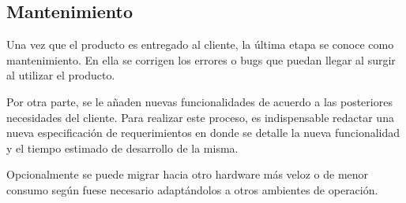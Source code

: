 \subsection{Mantenimiento}
Una vez que el producto es entregado al cliente, la última etapa se conoce como mantenimiento.
En ella se corrigen los errores o bugs que puedan llegar al surgir al utilizar el producto.

Por otra parte, se le añaden nuevas funcionalidades de acuerdo a las posteriores necesidades del cliente.
Para realizar este proceso, es indispensable redactar una nueva especificación de requerimientos en donde se detalle la nueva funcionalidad y el tiempo estimado de desarrollo de la misma.

Opcionalmente se puede migrar hacia otro hardware más veloz o de menor consumo según fuese necesario adaptándolos a otros ambientes de operación.
